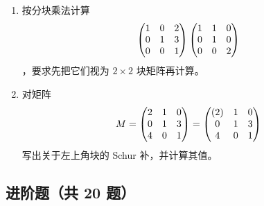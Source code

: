 \begin{enumerate}[label=\arabic*.]
  \item \basic 按分块乘法计算
  \[
  \begin{pmatrix} 1&0&2\\0&1&3\\0&0&1 \end{pmatrix}
  \begin{pmatrix} 1&1&0\\0&1&0\\0&0&2 \end{pmatrix}
  \]
  ，要求先把它们视为 $2\times2$ 块矩阵再计算。

  \item \basic 对矩阵
  \[
  M=\begin{pmatrix} 2&1&0\\0&1&3\\4&0&1 \end{pmatrix}
  =\begin{pmatrix} (2)&\begin{matrix}1&0\end{matrix}\\
  \begin{matrix}0\\4\end{matrix}&\begin{matrix}1&3\\0&1\end{matrix} \end{pmatrix}
  \]
  写出关于左上角块的 Schur 补，并计算其值。
\end{enumerate}

\subsection*{进阶题（共 20 题）}

